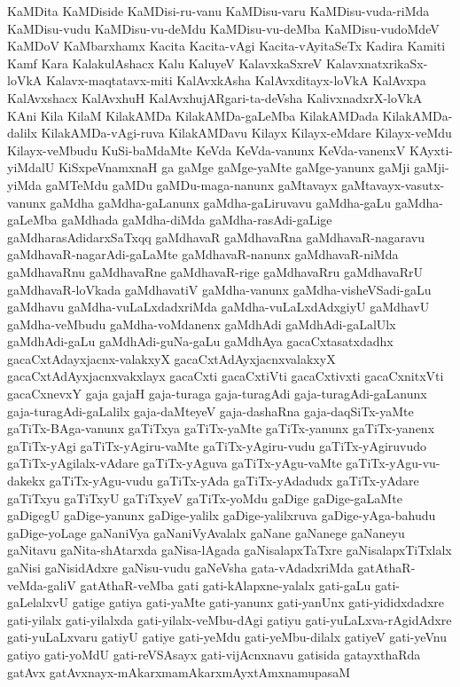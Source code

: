 {KaMDita
KaMDiside
KaMDisi-ru-vanu
KaMDisu-varu
KaMDisu-vuda-riMda
KaMDisu-vudu
KaMDisu-vu-deMdu
KaMDisu-vu-deMba
KaMDisu-vudoMdeV
KaMDoV
KaMbarxhamx
Kacita
Kacita-vAgi
Kacita-vAyitaSeTx
Kadira
Kamiti
Kamf
Kara
KalakulAshacx
Kalu
KaluyeV
KalavxkaSxreV
KalavxnatxrikaSx-loVkA
Kalavx-maqtatavx-miti
KalAvxkAsha
KalAvxditayx-loVkA
KalAvxpa
KalAvxshacx
KalAvxhuH
KalAvxhujARgari-ta-deVsha
KalivxnadxrX-loVkA
KAni
Kila
KilaM
KilakAMDa
KilakAMDa-gaLeMba
KilakAMDada
KilakAMDa-dalilx
KilakAMDa-vAgi-ruva
KilakAMDavu
Kilayx
Kilayx-eMdare
Kilayx-veMdu
Kilayx-veMbudu
KuSi-baMdaMte
KeVda
KeVda-vanunx
KeVda-vanenxV
KAyxti-yiMdalU
KiSxpeVnamxnaH
ga
gaMge
gaMge-yaMte
gaMge-yanunx
gaMji
gaMji-yiMda
gaMTeMdu
gaMDu
gaMDu-maga-nanunx
gaMtavayx
gaMtavayx-vasutx-vanunx
gaMdha
gaMdha-gaLanunx
gaMdha-gaLiruvavu
gaMdha-gaLu
gaMdha-gaLeMba
gaMdhada
gaMdha-diMda
gaMdha-rasAdi-gaLige
gaMdharasAdidarxSaTxqq
gaMdhavaR
gaMdhavaRna
gaMdhavaR-nagaravu
gaMdhavaR-nagarAdi-gaLaMte
gaMdhavaR-nanunx
gaMdhavaR-niMda
gaMdhavaRnu
gaMdhavaRne
gaMdhavaR-rige
gaMdhavaRru
gaMdhavaRrU
gaMdhavaR-loVkada
gaMdhavatiV
gaMdha-vanunx
gaMdha-visheVSadi-gaLu
gaMdhavu
gaMdha-vuLaLxdadxriMda
gaMdha-vuLaLxdAdxgiyU
gaMdhavU
gaMdha-veMbudu
gaMdha-voMdanenx
gaMdhAdi
gaMdhAdi-gaLalUlx
gaMdhAdi-gaLu
gaMdhAdi-guNa-gaLu
gaMdhAya
gacaCxtasatxdadhx
gacaCxtAdayxjacnx-valakxyX
gacaCxtAdAyxjacnxvalakxyX
gacaCxtAdAyxjacnxvakxlayx
gacaCxti
gacaCxtiVti
gacaCxtivxti
gacaCxnitxVti
gacaCxnevxY
gaja
gajaH
gaja-turaga
gaja-turagAdi
gaja-turagAdi-gaLanunx
gaja-turagAdi-gaLalilx
gaja-daMteyeV
gaja-dashaRna
gaja-daqSiTx-yaMte
gaTiTx-BAga-vanunx
gaTiTxya
gaTiTx-yaMte
gaTiTx-yanunx
gaTiTx-yanenx
gaTiTx-yAgi
gaTiTx-yAgiru-vaMte
gaTiTx-yAgiru-vudu
gaTiTx-yAgiruvudo
gaTiTx-yAgilalx-vAdare
gaTiTx-yAguva
gaTiTx-yAgu-vaMte
gaTiTx-yAgu-vu-dakekx
gaTiTx-yAgu-vudu
gaTiTx-yAda
gaTiTx-yAdadudx
gaTiTx-yAdare
gaTiTxyu
gaTiTxyU
gaTiTxyeV
gaTiTx-yoMdu
gaDige
gaDige-gaLaMte
gaDigegU
gaDige-yanunx
gaDige-yalilx
gaDige-yalilxruva
gaDige-yAga-bahudu
gaDige-yoLage
gaNaniVya
gaNaniVyAvalalx
gaNane
gaNanege
gaNaneyu
gaNitavu
gaNita-shAtarxda
gaNisa-lAgada
gaNisalapxTaTxre
gaNisalapxTiTxlalx
gaNisi
gaNisidAdxre
gaNisu-vudu
gaNeVsha
gata-vAdadxriMda
gatAthaR-veMda-galiV
gatAthaR-veMba
gati
gati-kAlapxne-yalalx
gati-gaLu
gati-gaLelalxvU
gatige
gatiya
gati-yaMte
gati-yanunx
gati-yanUnx
gati-yididxdadxre
gati-yilalx
gati-yilalxda
gati-yilalx-veMbu-dAgi
gatiyu
gati-yuLaLxva-rAgidAdxre
gati-yuLaLxvaru
gatiyU
gatiye
gati-yeMdu
gati-yeMbu-dilalx
gatiyeV
gati-yeVnu
gatiyo
gati-yoMdU
gati-reVSAsayx
gati-vijAcnxnavu
gatisida
gatayxthaRda
gatAvx
gatAvxnayx-mAkarxmamAkarxmAyxtAmxnamupasaM
}
